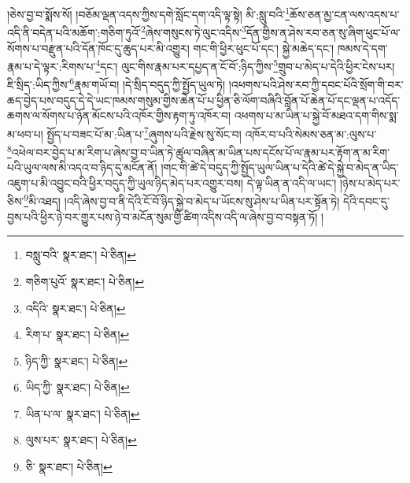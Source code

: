 །ཅེས་བྱ་བ་སྨོས་སོ། །བཅོམ་ལྡན་འདས་ཀྱིས་དགེ་སློང་དག་འདི་ལྟ་སྟེ། མི་:སླུ་བའི་\footnote{བསླུ་བའི་  སྣར་ཐང་།  པེ་ཅིན། }ཆོས་ཅན་མྱ་ངན་ལས་འདས་པ་འདི་ནི་བདེན་པའི་མཆོག་:གཅིག་ཏུའོ་\footnote{གཅིག་པུའོ་  སྣར་ཐང་།  པེ་ཅིན། }ཞེས་གསུངས་ཏེ་ལུང་འདིས་\footnote{འདིའི་  སྣར་ཐང་།  པེ་ཅིན། }དོན་གྱིས་ན་ཤེས་རབ་ཅན་སུ་ཞིག་ཕུང་པོ་ལ་སོགས་པ་བརྫུན་པའི་དོན་ཁོང་དུ་ཆུད་པར་མི་འགྱུར། གང་གི་ཕྱིར་ཕུང་པོ་དང་། སྐྱེ་མཆེད་དང་། ཁམས་དེ་དག་རྣམ་པ་དེ་ལྟར་:རིགས་པ་\footnote{རིག་པ་  སྣར་ཐང་།  པེ་ཅིན། }དང་། ལུང་གིས་རྣམ་པར་དཔྱད་ན་ངོ་བོ་:ཉིད་ཀྱིས་\footnote{ཉིད་ཀྱི་  སྣར་ཐང་།  པེ་ཅིན། }གྲུབ་པ་མེད་པ་དེའི་ཕྱིར་ངེས་པར། ཇི་སྲིད་:ཡིད་ཀྱིས་\footnote{ཡིད་ཀྱི་  སྣར་ཐང་།  པེ་ཅིན། }རྣམ་གཡོ་བ། །དེ་སྲིད་བདུད་ཀྱི་སྤྱོད་ཡུལ་ཏེ། །འཕགས་པའི་ཤེས་རབ་ཀྱི་དབང་པོའི་སྲོག་གི་བར་ཆད་བྱེད་པས་བདུད་དེ་དེ་ཡང་ཁམས་གསུམ་གྱིས་ཆེན་པོ་པ་ཕྱིན་ཅི་ལོག་བཞིའི་བློན་པོ་ཆེན་པོ་དང་ལྡན་པ་འདོད་ཆགས་ལ་སོགས་པ་ཉོན་མོངས་པའི་འཁོར་གྱིས་རྟག་ཏུ་འཁོར་བ། འཕགས་པ་མ་ཡིན་པ་སྐྱེ་བོ་མཐའ་དག་གིས་སྨ་མ་ཕབ་པ། སྤྱོད་པ་བཟང་པོ་མ་:ཡིན་པ་\footnote{ཡིན་པ་ལ་  སྣར་ཐང་།  པེ་ཅིན། }ཞུགས་པའི་རྗེས་སུ་སོང་བ། འཁོར་བ་པའི་སེམས་ཅན་མ་:ལུས་པ་\footnote{ལུས་པར་  སྣར་ཐང་།  པེ་ཅིན། }འཕེལ་བར་བྱེད་པ་མ་རིག་པ་ཞེས་བྱ་བ་ཡིན་ཏེ་ཚུལ་བཞིན་མ་ཡིན་པས་དངོས་པོ་ལ་རྣམ་པར་རྟོག་ན་མ་རིག་པའི་ཡུལ་ལས་མི་འདའ་བ་ཉིད་དུ་མངོན་ནོ། །གང་གི་ཚེ་དེ་བདུད་ཀྱི་སྤྱོད་ཡུལ་ཡིན་པ་དེའི་ཚེ་དེ་སྐྱེ་བ་མེད་ན་ཡིད་འཇུག་པ་མི་འབྱུང་བའི་ཕྱིར་བདུད་ཀྱི་ཡུལ་ཉིད་མེད་པར་འགྱུར་བས། དེ་ལྟ་ཡིན་ན་འདི་ལ་ཡང་། །ཉེས་པ་མེད་པར་ཅིས་\footnote{ཅི་  སྣར་ཐང་།  པེ་ཅིན། }མི་འཐད། །འདི་ཞེས་བྱ་བ་ནི་དེའི་ངོ་བོ་ཉིད་སྐྱེ་བ་མེད་པ་ཡོངས་སུ་ཤེས་པ་ཡིན་པར་སྟོན་ཏེ། དེའི་དབང་དུ་བྱས་པའི་ཕྱིར་ཉེ་བར་གྱུར་པས་ཉེ་བ་མངོན་སུམ་གྱི་ཚིག་འདིས་འདི་ལ་ཞེས་བྱ་བ་བསྟན་ཏོ། །
